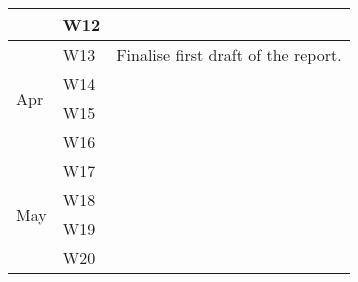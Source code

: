 \documentclass{article}
\begin{document}
\begin{table}[]
\begin{tabular}{lll}
                     & W12  & \\ \hline
\multirow{4}{*}{Apr} & W13  & Finalise first draft of the report. \\
                     & W14  & \\
                     & W15  & \\
                     & W16  & \\ \hline
\multirow{4}{*}{May} & W17  & \\
                     & W18  & \\
                     & W19  & \\
                     & W20  & \\
\end{tabular}
\end{table}

\newpage


\end{document}
